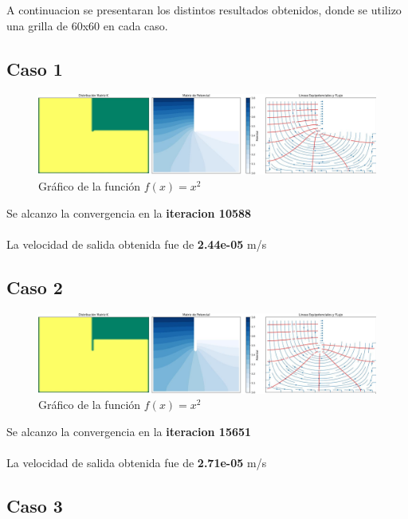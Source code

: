 A continuacion se presentaran los distintos resultados obtenidos, donde se utilizo una grilla de 60x60 en cada caso.

\subsection{Caso 1}

\begin{figure}[H]
    \centering
    \includegraphics[width=1\textwidth]{GRAFICOS/laplace_caso_1.jpg}
    \caption{Gráfico de la función $f(x) = x^2$}
    \label{fig:caso_1}
\end{figure}

Se alcanzo la convergencia en la \textbf{iteracion 10588}
\\ \\
La velocidad de salida obtenida fue de \textbf{2.44e-05} m/s

\subsection{Caso 2}

\begin{figure}[H]
    \centering
    \includegraphics[width=1\textwidth]{GRAFICOS/laplace_caso_2.jpg}
    \caption{Gráfico de la función $f(x) = x^2$}
    \label{fig:caso_2}
\end{figure}

Se alcanzo la convergencia en la \textbf{iteracion 15651}
\\ \\
La velocidad de salida obtenida fue de \textbf{2.71e-05} m/s

\subsection{Caso 3}

